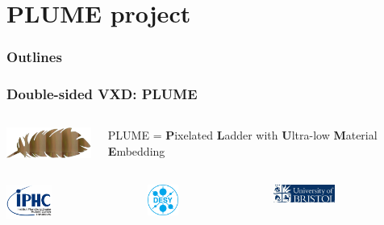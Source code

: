 \documentclass{beamer}
\begin{document}
\section{PLUME project}
\begin{frame}
    \frametitle{Outlines}
    \tableofcontents[currentsection,hideothersubsections, 
    sectionstyle=show/shaded,]
\end{frame}


\begin{frame}
  \frametitle{Double-sided VXD: PLUME}

  \begin{columns}[c]
    \begin{column}{3cm}
      \includegraphics[width = 3cm]{Pictures/logo_plume.png}
    \end{column}
    \vspace{-0.2cm}
    \begin{column}{7cm}
      PLUME = \textbf{P}ixelated \textbf{L}adder with \textbf{U}ltra-low \textbf{M}aterial \textbf{E}mbedding
    \end{column}
  \end{columns}

  \begin{columns}[t]
    \begin{column}{1cm}
      \includegraphics[width = 1.5cm]{Pictures/logo_IPHC_10cm.png}
    \end{column}
    \begin{column}{1cm}
      \includegraphics[width = 1cm]{Pictures/DESY-Logo.png}
    \end{column}
    \begin{column}{1cm}
      \includegraphics[width = 2cm]{Pictures/logo_uni_bristol.jpg}
    \end{column}
  \end{columns}


\end{frame}
\end{document}
